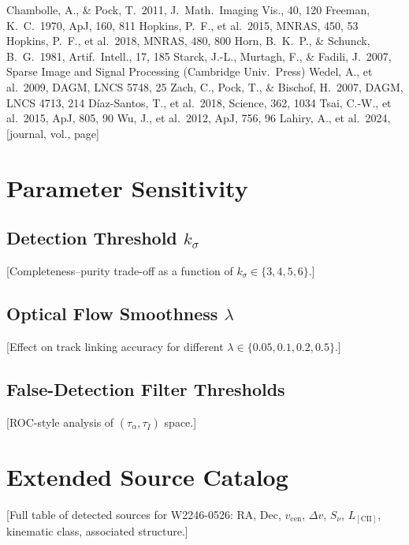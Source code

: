 \documentclass{aa}
\begin{document}
\begin{thebibliography}{}

 Chambolle, A., \& Pock, T.\ 2011, J.\ Math.\ Imaging Vis., 40, 120
 Freeman, K.\ C.\ 1970, ApJ, 160, 811
 Hopkins, P.\ F., et al.\ 2015, MNRAS, 450, 53
 Hopkins, P.\ F., et al.\ 2018, MNRAS, 480, 800
 Horn, B.\ K.\ P., \& Schunck, B.\ G.\ 1981, Artif.\ Intell., 17, 185
 Starck, J.-L., Murtagh, F., \& Fadili, J.\ 2007, Sparse Image and Signal Processing (Cambridge Univ.\ Press)
 Wedel, A., et al.\ 2009, DAGM, LNCS 5748, 25
 Zach, C., Pock, T., \& Bischof, H.\ 2007, DAGM, LNCS 4713, 214
 D\'iaz-Santos, T., et al.\ 2018, Science, 362, 1034
 Tsai, C.-W., et al.\ 2015, ApJ, 805, 90
 Wu, J., et al.\ 2012, ApJ, 756, 96
 Lahiry, A., et al.\ 2024, [journal, vol., page]

\end{thebibliography}

\appendix
\section{Parameter Sensitivity}
\label{app:params}

\subsection{Detection Threshold $k_\sigma$}
[Completeness--purity trade-off as a function of $k_\sigma \in \{3, 4, 5, 6\}$.]

\subsection{Optical Flow Smoothness $\lambda$}
[Effect on track linking accuracy for different $\lambda \in \{0.05, 0.1, 0.2, 0.5\}$.]

\subsection{False-Detection Filter Thresholds}
[ROC-style analysis of $(\tau_\alpha, \tau_{\bar{I}})$ space.]

\section{Extended Source Catalog}
\label{app:catalog}

[Full table of detected sources for W2246-0526: RA, Dec, $v_\mathrm{cen}$, $\Delta v$, $S_\nu$, $L_\mathrm{[CII]}$, kinematic class, associated structure.]
\end{document}
